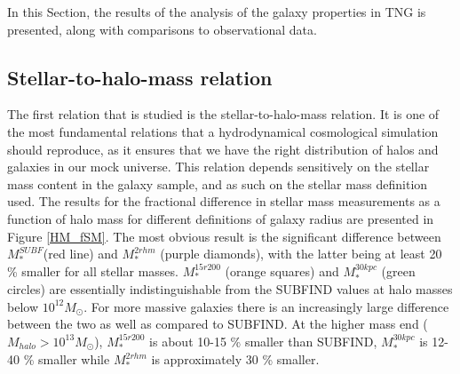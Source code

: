 In this Section, the results of the analysis of the galaxy properties in TNG is presented, along with comparisons to observational data.

\subsection{Stellar-to-halo-mass relation}

The first relation that is studied is the stellar-to-halo-mass relation. It is one of the most fundamental relations that a hydrodynamical cosmological simulation should reproduce, as it ensures that we have the right distribution of halos and galaxies in our mock universe. This relation depends sensitively on the stellar mass content in the galaxy sample, and as such on the stellar mass definition used. The results for the fractional difference in stellar mass measurements as a function of halo mass for different definitions of galaxy radius are presented in Figure \ref{HM_fSM}. The most obvious result is the significant difference between $M_\ast^{SUBF}$(red line) and $M_\ast^{2rhm}$ (purple diamonds), with the latter being at least 20 \% smaller for all stellar masses. $M_\ast^{15r200}$ (orange squares) and $M_\ast^{30kpc}$ (green circles) are essentially indistinguishable from the SUBFIND values at halo masses below $10^{12} M_{\odot}$. For more massive galaxies there is an increasingly large difference between the two as well as compared to SUBFIND. At the higher mass end ($M_{halo} > 10^{13} M_{\odot}$), $M_\ast^{15r200}$ is about 10-15 \% smaller than SUBFIND, $M_\ast^{30kpc}$ is 12-40 \% smaller while $M_\ast^{2rhm}$ is approximately 30 \% smaller.


